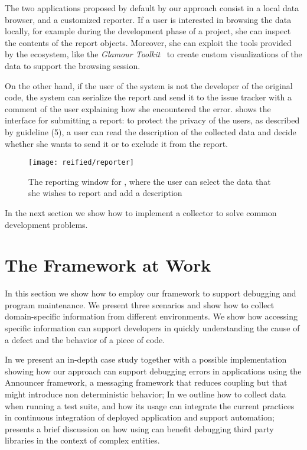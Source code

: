 The two applications proposed by default by our approach consist in a local data browser, and a customized reporter.
If a user is interested in browsing the data locally, for example during the development phase of a project, she can inspect the contents of the report objects.
Moreover, she can exploit the tools provided by the \pha ecosystem, like the \emph{Glamour Toolkit}~\cite{Girb2013a} to create custom visualizations of the data to support the browsing session.

On the other hand, if the user of the system is not the developer of the original code, the system can serialize the report and send it to the issue tracker with a comment of the user explaining how she encountered the error.
 shows the interface for submitting a report: to protect the privacy of the users, as described by guideline (5), a user can read the description of the collected data and decide whether she wants to send it or to exclude it from the report.

\begin{figure}[ht]
  \centering
  \texttt{[image: reified/reporter]}
  \caption[The reporting window for \sln]{The reporting window for \sln, where the user can select the data that she wishes to report and add a description}
  \label{fig:reporter}
\end{figure}

In the next section we show how to implement a collector to solve common development problems.


\section{The Framework at Work}\label{sec:reified-stories}

In this section we show how to employ our framework to support debugging and program maintenance.
We present three scenarios and show how to collect domain-specific information from different environments.
We show how accessing specific information can support developers in quickly understanding the cause of a defect and the behavior of a piece of code.

In  we present an in-depth case study together with a possible implementation showing how our approach can support debugging errors in applications using the Announcer framework, a messaging framework that reduces coupling but that might introduce non deterministic behavior; In  we outline how to collect data when running a test suite, and how its usage can integrate the current practices in continuous integration of deployed application and support automation;  presents a brief discussion on how using \sln can benefit debugging third party libraries in the context of complex entities.


